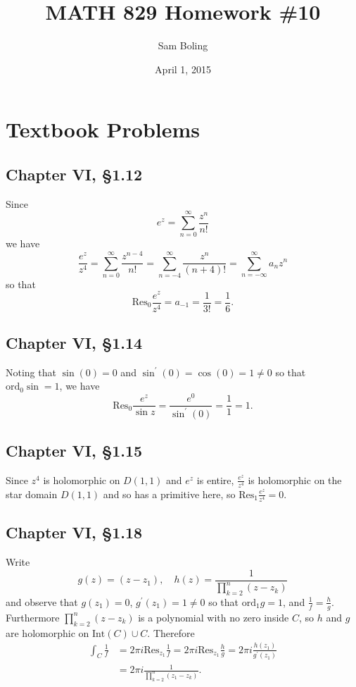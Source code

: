 \documentclass{article}
\title{MATH 829 Homework \#10}
\date{April 1, 2015}
\author{Sam Boling}
\newcommand\Res{\mathrm{Res}}
\newcommand\ord{\mathrm{ord}}
\newcounter{Problem}
\begin{document}
\begin{titlepage}
\maketitle
\end{titlepage}

\section{Textbook Problems}
\subsection*{Chapter VI, \S1.12}
Since
$$
e^z = \sum_{n=0}^\infty \frac{z^n}{n!}
$$
we have
$$
  \frac{e^z}{z^4}
= \sum_{n=0}^\infty \frac{z^{n-4}}{n!}
= \sum_{n=-4}^\infty \frac{z^n}{(n+4)!}
= \sum_{n=-\infty}^\infty a_n z^n
$$
so that 
$$
  \Res_0 \frac{e^z}{z^4} 
= a_{-1} 
= \frac{1}{3!} 
= \frac{1}{6}.
$$

\subsection*{Chapter VI, \S1.14}
Noting that $\sin(0) = 0$ and 
$\sin^\prime(0) = \cos(0) = 1 \neq 0$
so that $\ord_0 \sin = 1$, we have 
$$
  \Res_0 \frac{e^z}{\sin z}
= \frac{e^0}{\sin^\prime(0)}
= \frac{1}{1}
= 1.
$$

\subsection*{Chapter VI, \S1.15}
Since $z^4$ is holomorphic on $D(1, 1)$ and
$e^z$ is entire, $\frac{e^z}{z^4}$ is holomorphic on the
star domain $D(1,1)$ and so has a primitive here,
so $\Res_1 \frac{e^z}{z^4} = 0$.

\subsection*{Chapter VI, \S1.18}
Write 
$$
g(z) = (z - z_1), \quad
h(z) = \frac{1}{\prod_{k=2}^n (z - z_k)}
$$
and observe that $g(z_1) = 0$, 
$g^\prime(z_1) = 1 \neq 0$ so that $\ord_1 g = 1$,
and $\frac{1}{f} = \frac{h}{g}$. Furthermore
$\prod_{k=2}^n (z - z_k)$ is a polynomial with no zero inside 
$C$, so $h$ and $g$ are holomorphic on $\mathrm{Int}(C) \cup C$.
Therefore 
\begin{align*}
   \int_C \frac{1}{f} 
&= 2 \pi i \Res_{z_1} \frac{1}{f}
 = 2 \pi i \Res_{z_1} \frac{h}{g}
 = 2 \pi i \frac{h(z_1)}{g^\prime(z_1)} \\
&= 2 \pi i \frac{1}{\prod_{k=2}^n (z_1 - z_k)}.
\end{align*}
\end{document}
